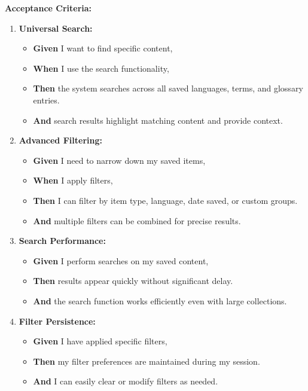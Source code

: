 \documentclass[12pt]{article}
\begin{document}
\vspace{1em}
\textbf{Acceptance Criteria:}
\begin{enumerate}
    \item \textbf{Universal Search:}
    \begin{itemize}
        \item \textbf{Given} I want to find specific content,
        \item \textbf{When} I use the search functionality,
        \item \textbf{Then} the system searches across all saved languages, terms, and glossary entries.
        \item \textbf{And} search results highlight matching content and provide context.
    \end{itemize}

    \item \textbf{Advanced Filtering:}
    \begin{itemize}
        \item \textbf{Given} I need to narrow down my saved items,
        \item \textbf{When} I apply filters,
        \item \textbf{Then} I can filter by item type, language, date saved, or custom groups.
        \item \textbf{And} multiple filters can be combined for precise results.
    \end{itemize}

    \item \textbf{Search Performance:}
    \begin{itemize}
        \item \textbf{Given} I perform searches on my saved content,
        \item \textbf{Then} results appear quickly without significant delay.
        \item \textbf{And} the search function works efficiently even with large collections.
    \end{itemize}

    \item \textbf{Filter Persistence:}
    \begin{itemize}
        \item \textbf{Given} I have applied specific filters,
        \item \textbf{Then} my filter preferences are maintained during my session.
        \item \textbf{And} I can easily clear or modify filters as needed.
    \end{itemize}
\end{enumerate}
\end{document}
